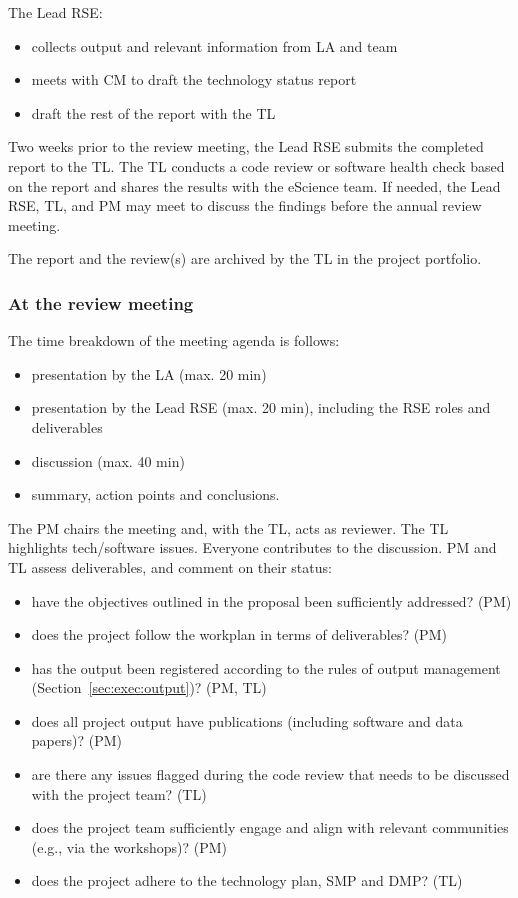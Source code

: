 The Lead RSE:
\begin{itemize}\itemsep0em
\item collects output and relevant information from LA and team
\item meets with CM to draft the technology status report  
\item draft the rest of the report with the TL
\end{itemize}

Two weeks prior to the review meeting, the Lead RSE submits the completed report to the TL. The TL conducts a code 
review or software health check based on the report and shares the results with the eScience team. If needed, 
the Lead RSE, TL, and PM may meet to discuss the findings before the annual review meeting.

The report and the review(s) are archived by the TL in the project portfolio.

\subsubsection{At the review meeting}
The time breakdown of the meeting agenda is follows:
\begin{itemize}\itemsep0em
\item presentation by the LA (max. 20 min)
\item presentation by the Lead RSE (max. 20 min), including the RSE roles and deliverables
\item discussion (max. 40 min)
\item summary, action points and conclusions.
\end{itemize}

The PM chairs the meeting and, with the TL, acts as reviewer. The TL highlights tech/software issues. Everyone contributes to the discussion. PM and TL assess deliverables, and comment on their status:
\begin{itemize}\itemsep0em
\item have the objectives outlined in the proposal been sufficiently addressed? (PM)
\item does the project follow the workplan in terms of deliverables? (PM)
\item has the output been registered according to the rules of output management (Section~\ref{sec:exec:output})? (PM, TL)
\item does all project output have publications (including software and data papers)? (PM)
\item are there any issues flagged during the code review that needs to be discussed with the project team? (TL)
\item does the project team sufficiently engage and align with relevant communities (e.g., via the workshops)? (PM)
\item does the project adhere to the technology plan, SMP and DMP? (TL)
\end{itemize}

